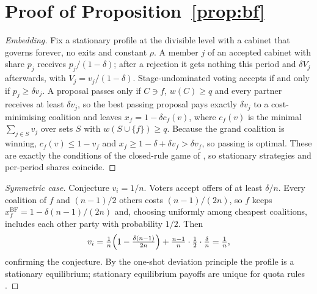 \documentclass[11pt,a4paper]{article}
\newcommand{\BF}{\mathrm{BF}}
\begin{document}
\section{Proof of Proposition~\ref{prop:bf}}\label{app:proofs}
\begin{proof}[Embedding]
Fix a stationary profile at the divisible level with a cabinet that governs forever, no exits and
constant $\rho$. A member $j$ of an accepted cabinet with share $p_j$ receives $p_j/(1-\delta)$; after a
rejection it gets nothing this period and $\delta V_j$ afterwards, with $V_j=v_j/(1-\delta)$.
Stage-undominated voting accepts if and only if $p_j\ge\delta v_j$. A proposal passes only if $C\ni f$,
$w(C)\ge q$ and every partner receives at least $\delta v_j$, so the best passing proposal pays exactly
$\delta v_j$ to a cost-minimising coalition and leaves $x_f=1-\delta c_f(v)$, where $c_f(v)$ is the
minimal $\sum_{j\in S}v_j$ over sets $S$ with $w(S\cup\{f\})\ge q$. Because the grand coalition is
winning, $c_f(v)\le1-v_f$ and $x_f\ge1-\delta+\delta v_f>\delta v_f$, so passing is optimal. These are
exactly the conditions of the closed-rule game of \citet{baron1989}, so stationary strategies and
per-period shares coincide.
\end{proof}
\begin{proof}[Symmetric case]
Conjecture $v_i=1/n$. Voters accept offers of at least $\delta/n$. Every coalition of $f$ and $(n-1)/2$
others costs $(n-1)/(2n)$, so $f$ keeps $x^{\BF}_f=1-\delta(n-1)/(2n)$ and, choosing uniformly among
cheapest coalitions, includes each other party with probability $1/2$. Then
\[
v_i=\tfrac1n\Bigl(1-\tfrac{\delta(n-1)}{2n}\Bigr)+\tfrac{n-1}{n}\cdot\tfrac12\cdot\tfrac{\delta}{n}=\tfrac1n,
\]
confirming the conjecture. By the one-shot deviation principle the profile is a stationary equilibrium;
stationary equilibrium payoffs are unique for quota rules \citep{eraslan2002}.
\end{proof}
\end{document}
